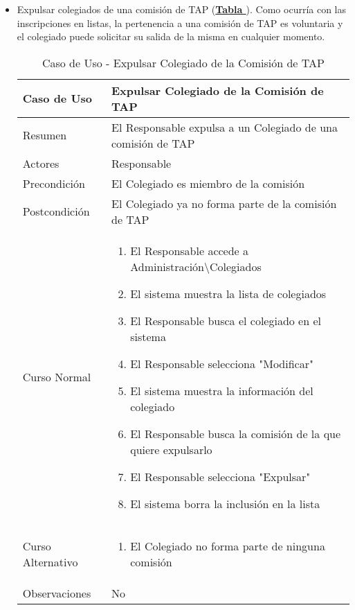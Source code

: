 \begin{itemize}
	\item \addtocounter{tabla}{1} Expulsar colegiados de una comisión de TAP (\textbf{\hyperref[tab:curExpulsarColegComisionTAP]{Tabla }}). Como ocurría con las inscripciones en listas, la pertenencia a una comisión de TAP es voluntaria y el colegiado puede solicitar su salida de la misma en cualquier momento.
		\begin{table}[!htbp]
		  \centering  \addtocounter{casouso}{1}
		  \begin{tabular}{|l | p{100mm}|}
		    \textbf{Caso de Uso}  & \textbf{Expulsar Colegiado de la Comisión de TAP} \\ \hline
		    Resumen 		 & El Responsable expulsa a un Colegiado de una comisión de TAP \\ \hline
		    Actores  		 & Responsable \\ \hline
		    Precondición  	 & El Colegiado es miembro de la comisión  \\ \hline
		    Postcondición  	 & El Colegiado ya no forma parte de la comisión de TAP \\ \hline
		    Curso Normal   	 & \begin{enumerate}
		      \item El Responsable accede a Administración\textbackslash Colegiados
			  \item El sistema muestra la lista de colegiados
			  \item El Responsable busca el colegiado en el sistema
			  \item El Responsable selecciona "Modificar"
			  \item El sistema muestra la información del colegiado
			  \item El Responsable busca la comisión de la que quiere expulsarlo
			  \item El Responsable selecciona "Expulsar"
			  \item El sistema borra la inclusión en la lista
		    \end{enumerate}  \\ \hline
		    Curso Alternativo  & \begin{enumerate}
			  \item El Colegiado no forma parte de ninguna comisión
		    \end{enumerate}  \\ \hline
		    Observaciones 	 & No  \\ \hline
		  \end{tabular}
		  \caption{Caso de Uso  - Expulsar Colegiado de la Comisión de TAP}
		  \label{tab:curExpulsarColegComisionTAP}
		\end{table}
		\FloatBarrier \pagebreak


\end{itemize}
